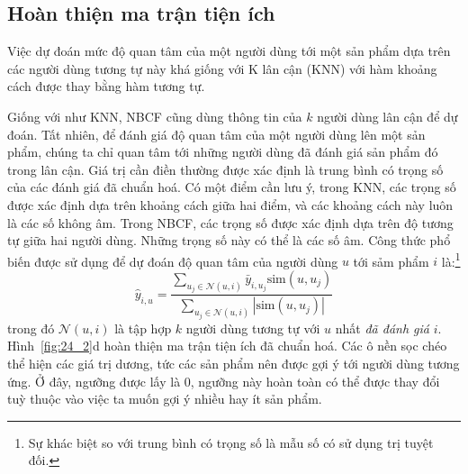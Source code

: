  
 
 
\subsection{Hoàn thiện ma trận tiện ích}
 
Việc {dự đoán mức độ quan tâm} của một
người dùng tới một sản phẩm dựa trên các người dùng tương tự này khá giống với 
{K lân cận} (KNN) với hàm khoảng cách được thay bằng hàm tương tự. 
 
Giống với như KNN, NBCF cũng dùng thông tin của $k$ người dùng lân cận để dự
đoán. Tất nhiên, để đánh giá độ quan tâm của một người dùng lên một
sản phẩm, chúng ta chỉ quan tâm tới những người dùng
đã đánh giá sản phẩm đó trong lân cận. {Giá trị cần điền} thường được xác
định là {trung bình có trọng số} của các đánh giá đã chuẩn hoá. Có một điểm cần lưu ý, trong KNN, các trọng số được xác định dựa trên
khoảng cách giữa hai điểm, và các khoảng cách này luôn là các số không âm.
Trong NBCF, các trọng số được xác định dựa trên độ tương tự giữa hai
người dùng. Những trọng số này có thể là các số âm. Công thức phổ biến được sử
dụng để dự đoán độ quan tâm của người dùng $u$ tới sảm phẩm $i$
là:\footnote{Sự khác biệt so với trung bình có trọng số là mẫu số có sử dụng trị
tuyệt đối.}
\begin{equation} 
\hat{y}_{i, u} = \frac{\sum_{u_j \in \mathcal{N}(u, i)} \bar{y}_{i, u_j} \text{sim}(u, u_j)}{\sum_{u_j \in \mathcal{N}(u, i)} |\text{sim}(u, u_j)|}
\end{equation} 
trong đó $\mathcal{N}(u, i)$ là tập hợp $k$ người dùng tương tự với $u$ nhất \textit{đã đánh giá} $i$.
Hình~\ref{fig:24_2}d hoàn thiện
ma trận tiện ích đã chuẩn hoá. Các ô
nền sọc chéo thể hiện các giá trị dương, tức các sản phẩm nên được gợi ý tới người dùng tương ứng. Ở đây, ngưỡng được lấy là 0, ngưỡng này
hoàn toàn có thể được thay đổi tuỳ thuộc vào việc ta muốn gợi ý nhiều hay ít
sản phẩm. 

